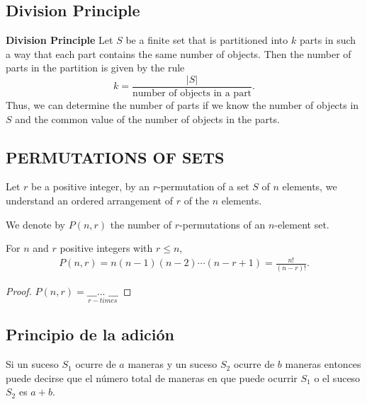 \subsection{Division Principle}

\begin{definition}{\bf Division Principle}
    Let $S$ be a finite set that is partitioned into $k$ parts in such a way that each part contains the same number of objects. Then the number 
    of parts in the partition is given by the rule
    $$ k = \frac{|S|}{\text{number of objects in a part}}.$$
    Thus, we can determine the number of parts if we know the number of objects in $S$ and the common value 
    of the number of objects in the parts.
\end{definition}

\subsection{PERMUTATIONS OF SETS}
Let $r$ be a positive integer, by an $r$-permutation of a set $S$ of $n$ elements, we understand an ordered arrangement of $r$ 
of the $n$ elements. 

We denote by $P(n,r)$ the number of $r$-permutations of an $n$-element set. 

\begin{theorem}
    For $n$ and $r$ positive integers with $r\leq n$, 
    \begin{align}
        P(n,r) = n(n-1)(n-2)\cdots(n-r+1) = \frac{n!}{(n-r)!}.
    \end{align}
    \begin{proof}
        $P(n,r) =  \underset{r-times}{\text{\_ \_ \_} \ldots\text{ \_ \_ \_ }}$
    \end{proof}
\end{theorem}



\subsection{Principio de la adici\'on}
Si un suceso $S_{1}$  ocurre de $a$ maneras y un suceso $S_{2}$ ocurre de $b$ maneras entonces puede decirse que el n\'umero total de maneras en que puede
ocurrir $S_1$ o el suceso $S_2$ es $a+b$.


